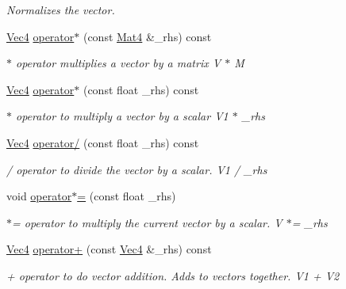 \begin{DoxyCompactItemize}
\begin{DoxyCompactList}\small\item\em Normalizes the vector. \item\end{DoxyCompactList}\item 
\hyperlink{classVec4}{Vec4} \hyperlink{classVec4_ab73619ea670cbd2eb25e5a3ef49dfd9a}{operator$\ast$} (const \hyperlink{classMat4}{Mat4} \&\_\-rhs) const 
\begin{DoxyCompactList}\small\item\em $\ast$ operator multiplies a vector by a matrix V $\ast$ M \item\end{DoxyCompactList}\item 
\hyperlink{classVec4}{Vec4} \hyperlink{classVec4_a7404d7984c8612d9e9cac17c8609b808}{operator$\ast$} (const float \_\-rhs) const 
\begin{DoxyCompactList}\small\item\em $\ast$ operator to multiply a vector by a scalar V1 $\ast$ \_\-rhs \item\end{DoxyCompactList}\item 
\hyperlink{classVec4}{Vec4} \hyperlink{classVec4_a294635742b4d62d2a6062f9cb6bb3a4a}{operator/} (const float \_\-rhs) const 
\begin{DoxyCompactList}\small\item\em / operator to divide the vector by a scalar. V1 / \_\-rhs \item\end{DoxyCompactList}\item 
void \hyperlink{classVec4_a98eed34b9e22227e1e448bbc9345f50e}{operator$\ast$=} (const float \_\-rhs)
\begin{DoxyCompactList}\small\item\em $\ast$= operator to multiply the current vector by a scalar. V $\ast$= \_\-rhs \item\end{DoxyCompactList}\item 
\hyperlink{classVec4}{Vec4} \hyperlink{classVec4_a58014ec694674a8c27587a03037f0f09}{operator+} (const \hyperlink{classVec4}{Vec4} \&\_\-rhs) const 
\begin{DoxyCompactList}\small\item\em + operator to do vector addition. Adds to vectors together. V1 + V2 \item\end{DoxyCompactList}\item 

\end{DoxyCompactItemize}
